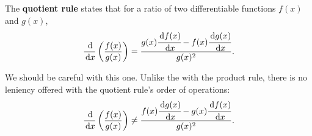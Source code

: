 \begin{theorem}
  The \textbf{quotient rule} states that for a ratio of two differentiable functions $f(x)$ and $g(x)$,
  \begin{equation}
    \frac{\,\mathrm{d}}{\,\mathrm{d} x}\left(\frac{f(x)}{g(x)}\right)=\frac{g(x)\cfrac{\,\mathrm{d} f(x)}{\,\mathrm{d} x}-f(x)\cfrac{\,\mathrm{d} g(x)}{\,\mathrm{d} x}}{g(x)^2}.
  \end{equation}
\end{theorem}
We should be careful with this one.
Unlike the with the product rule, there is no leniency offered with the quotient rule's order of operations:
\begin{equation}
  \frac{\,\mathrm{d}}{\,\mathrm{d} x}\left(\frac{f(x)}{g(x)}\right) \neq \frac{f(x)\cfrac{\,\mathrm{d} g(x)}{\,\mathrm{d} x}-g(x)\cfrac{\,\mathrm{d} f(x)}{\,\mathrm{d} x}}{g(x)^2}.
\end{equation}


